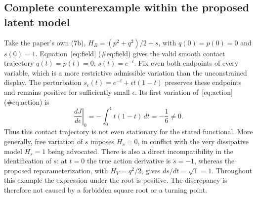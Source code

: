 \documentclass[10pt]{article}
\begin{document}
\subsection*{Complete counterexample within the proposed latent model}
Take the paper’s own (7b), \(H_B=(p^2+q^2)/2+s\), with \(q(0)=p(0)=0\) and \(s(0)=1\). Equation [eq:field] (\#eq:field) gives the valid smooth contact trajectory \(q(t)=p(t)=0\), \(s(t)=e^{-t}\). Fix even both endpoints of every variable, which is a more restrictive admissible variation than the unconstrained display. The perturbation \(s_\epsilon(t)=e^{-t}+\epsilon t(1-t)\) preserves these endpoints and remains positive for sufficiently small \(\epsilon\). Its first variation of [eq:action] (\#eq:action) is \[\left.\frac{dJ}{d\epsilon}\right|_{0}
 =-\int_0^1t(1-t)\,dt=-\frac16\ne0.\] Thus this contact trajectory is not even stationary for the stated functional. More generally, free variation of \(s\) imposes \(H_s=0\), in conflict with the very dissipative model \(H_s=1\) being advocated. There is also a direct incompatibility in the identification of \(s\): at \(t=0\) the true action derivative is \(\dot s=-1\), whereas the proposed reparameterization, with \(H_V=q^2/2\), gives \(ds/dt=\sqrt{1}=1\). Throughout this example the expression under the root is positive. The discrepancy is therefore not caused by a forbidden square root or a turning point.\par
\end{document}

